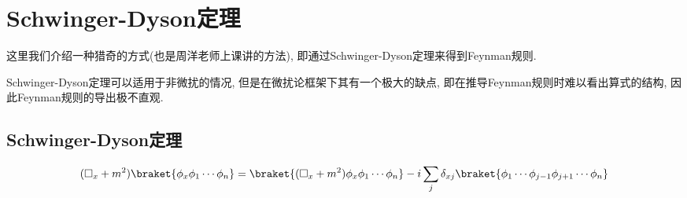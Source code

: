 \section{Schwinger-Dyson定理}
这里我们介绍一种猎奇的方式(也是周洋老师上课讲的方法), 即通过Schwinger-Dyson定理来得到Feynman规则. 

Schwinger-Dyson定理可以适用于非微扰的情况, 但是在微扰论框架下其有一个极大的缺点, 即在推导Feynman规则时难以看出算式的结构, 因此Feynman规则的导出极不直观.

\subsection{Schwinger-Dyson定理}
\begin{theorem}\label{SchwingerDysonTheorem}
    \begin{equation}
        (\Box_x+m^2)\braket{\phi_x\phi_1\cdots\phi_n}=\braket{(\Box_x+m^2)\phi_x\phi_1\cdots\phi_n}-i\sum_j\delta_{xj}\braket{\phi_1\cdots\phi_{j-1}\phi_{j+1}\cdots\phi_n}
    \end{equation}
\end{theorem}
